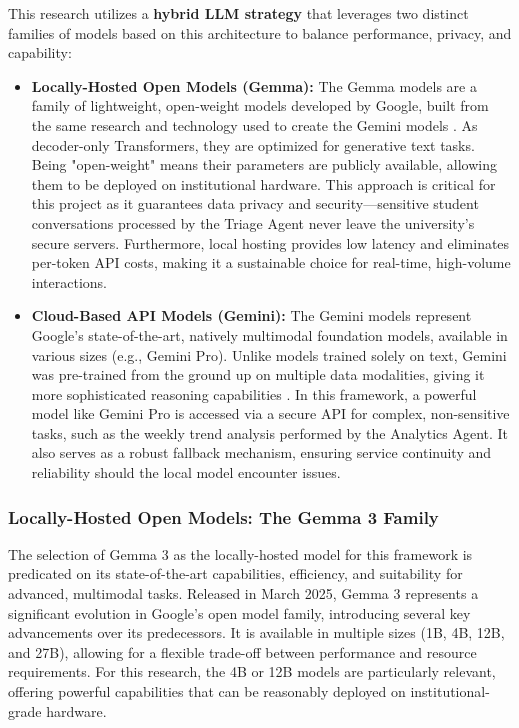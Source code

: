 This research utilizes a \textbf{hybrid LLM strategy} that leverages two distinct families of models based on this architecture to balance performance, privacy, and capability:
\begin{itemize}
    \item \textbf{Locally-Hosted Open Models (Gemma):} The Gemma models are a family of lightweight, open-weight models developed by Google, built from the same research and technology used to create the Gemini models \cite{FIND_CITATION_PLEASE}. As decoder-only Transformers, they are optimized for generative text tasks. Being "open-weight" means their parameters are publicly available, allowing them to be deployed on institutional hardware. This approach is critical for this project as it guarantees data privacy and security—sensitive student conversations processed by the Triage Agent never leave the university's secure servers. Furthermore, local hosting provides low latency and eliminates per-token API costs, making it a sustainable choice for real-time, high-volume interactions.
    \item \textbf{Cloud-Based API Models (Gemini):} The Gemini models represent Google's state-of-the-art, natively multimodal foundation models, available in various sizes (e.g., Gemini Pro). Unlike models trained solely on text, Gemini was pre-trained from the ground up on multiple data modalities, giving it more sophisticated reasoning capabilities \cite{FIND_CITATION_PLEASE}. In this framework, a powerful model like Gemini Pro is accessed via a secure API for complex, non-sensitive tasks, such as the weekly trend analysis performed by the Analytics Agent. It also serves as a robust fallback mechanism, ensuring service continuity and reliability should the local model encounter issues.
\end{itemize}

\subsubsection{Locally-Hosted Open Models: The Gemma 3 Family}

The selection of Gemma 3 as the locally-hosted model for this framework is predicated on its state-of-the-art capabilities, efficiency, and suitability for advanced, multimodal tasks. Released in March 2025, Gemma 3 represents a significant evolution in Google's open model family, introducing several key advancements over its predecessors. It is available in multiple sizes (1B, 4B, 12B, and 27B), allowing for a flexible trade-off between performance and resource requirements. For this research, the 4B or 12B models are particularly relevant, offering powerful capabilities that can be reasonably deployed on institutional-grade hardware.

